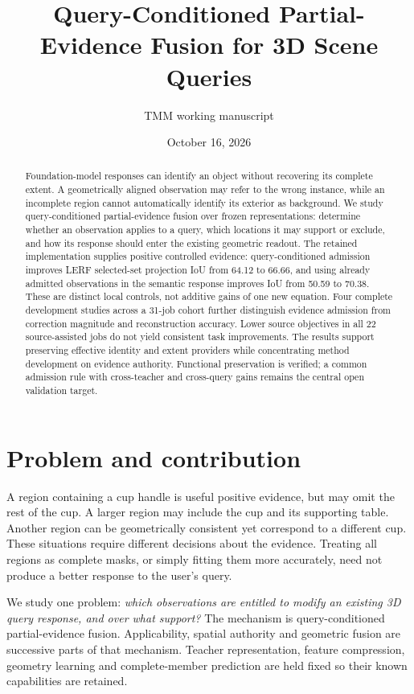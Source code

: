\documentclass[10pt]{article}
\title{Query-Conditioned Partial-Evidence Fusion for 3D Scene Queries}
\author{TMM working manuscript}
\date{October 16, 2026}
\begin{document}
\maketitle
\begin{abstract}
Foundation-model responses can identify an object without recovering its complete
extent. A geometrically aligned observation may refer to the wrong instance,
while an incomplete region cannot automatically identify its exterior as
background. We study query-conditioned partial-evidence fusion over frozen
representations: determine whether an observation applies to a query, which
locations it may support or exclude, and how its response should enter the
existing geometric readout. The retained implementation supplies positive
controlled evidence: query-conditioned admission improves LERF selected-set
projection IoU from 64.12 to 66.66, and using already admitted observations in
the semantic response improves IoU from 50.59 to 70.38. These are distinct local
controls, not additive gains of one new equation. Four complete development
studies across a 31-job cohort further distinguish evidence admission from
correction magnitude and reconstruction accuracy. Lower source objectives in
all 22 source-assisted jobs do not yield consistent task improvements. The
results support preserving effective identity and extent providers while
concentrating method development on evidence authority. Functional preservation
is verified; a common admission rule with cross-teacher and cross-query gains
remains the central open validation target.
\end{abstract}

\section{Problem and contribution}
A region containing a cup handle is useful positive evidence, but may omit the
rest of the cup. A larger region may include the cup and its supporting table.
Another region can be geometrically consistent yet correspond to a different
cup. These situations require different decisions about the evidence. Treating
all regions as complete masks, or simply fitting them more accurately, need not
produce a better response to the user's query.

We study one problem: \emph{which observations are entitled to modify an existing
3D query response, and over what support?} The mechanism is query-conditioned
partial-evidence fusion. Applicability, spatial authority and geometric fusion
are successive parts of that mechanism. Teacher representation, feature
compression, geometry learning and complete-member prediction are held fixed
so their known capabilities are retained.
\end{document}

